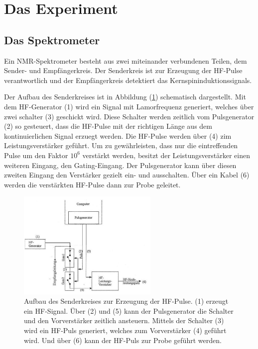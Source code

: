 \section{Das Experiment}
\subsection{Das Spektrometer}
Ein NMR-Spektrometer besteht aus zwei miteinander verbundenen Teilen, dem Sender- und Empf\"{a}ngerkreis.
Der Senderkreis ist zur Erzeugung der HF-Pulse verantwortlich und der Empf\"{a}ngerkreis detektiert das Kernspininduktionssignals.

Der Aufbau des Senderkreises ist in Abbildung (\ref{senderkreis.}) schematisch dargestellt.
Mit dem HF-Generator (1) wird ein Signal mit Lamorfrequenz generiert, welches \"{u}ber zwei schalter (3) geschickt wird.
Diese Schalter werden zeitlich vom Pulsgenerator (2) so gesteuert, dass die HF-Pulse mit der richtigen L\"{a}nge aus dem kontinuierlichen Signal erzuegt werden.
Die HF-Pulse werden \"{u}ber (4) zim Leistungsverst\"{a}rker gef\"{u}hrt.
Um zu gew\"{a}hrleisten, dass nur die eintreffenden Pulse um den Faktor $10^6$ verst\"{a}rkt werden, besitzt der Leistungsverst\"{a}rker einen weiteren Eingang, den Gating-Eingang.
Der Pulsgenerator kann \"{u}ber diesen zweiten Eingang den Verst\"{a}rker gezielt ein- und ausschalten.
\"{U}ber ein Kabel (6) werden die verst\"{a}rkten HF-Pulse dann zur Probe geleitet.
\setcounter{figure}{10}
\begin{figure}
	\centering
	\includegraphics[width=0.6\textwidth]{Plots/spektrometer.png}
	\caption{Aufbau des Senderkreises zur Erzeugung der HF-Pulse. (1) erzeugt ein HF-Signal. \"{U}ber (2) und (5) kann der Pulsgenerator die Schalter und den Vorverst\"{a}rker zeitlich ansteuern. Mittels der Schalter (3) wird ein HF-Puls generiert, welches zum Vorverst\"{a}rker (4) gef\"{u}hrt wird. Und \"{u}ber (6) kann der HF-Puls  zur Probe gef\"{u}hrt werden.}
	\label{senderkreis.}
\end{figure}

